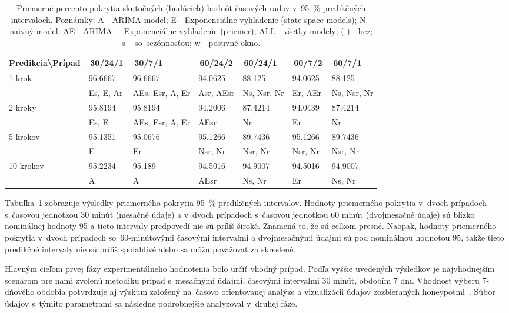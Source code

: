 \documentclass[thesismargins, thesislinespacing, openright, upjsfrontpage]{rnthesis}
\begin{document}
\begin{table}[h]
    \centering
    \footnotesize 
    \begin{tabular}{|p{3cm}|p{1.5cm}|p{1.5cm}|p{1.5cm}|p{1.5cm}|p{1.5cm}|p{1.5cm}|} \hline
        Predikcia\textbackslash Prípad & \,30/24/1\, & \,30/7/1\, & \,60/24/2\, & \,60/24/1\, & \,60/7/2\, & \,60/7/1\, \\
     \hline\hline
        \multirow{2}{*}{1 krok} & 96.6667 & 96.6667 & 94.0625 & 88.125 & 94.0625 & 88.125 \\
        & Es, E, Ar & AEs, Esr, A, Er & Asr, AEsr & Ns, Nsr, Nr & Er, AEr & Ns, Nsr, Nr  \\
        \hline
        \multirow{2}{*}{2 kroky} & 95.8194 & 95.8194 & 94.2006 & 87.4214 & 94.0439 & 87.4214 \\
        & Es, E & AEs, Esr, A, Er & AEsr & Nr & Er & Nr \\
        \hline
        \multirow{2}{*}{5 krokov} & 95.1351 & 95.0676 & 95.1266 & 89.7436 & 95.1266 & 89.7436 \\
        & E & Er & Nsr, Nr & Nsr, Nr & Nsr, Nr & Nsr, Nr  \\
        \hline
        \multirow{2}{*}{10 krokov} & 95.2234 & 95.189 & 94.5016 & 94.9007 & 94.5016 & 94.9007 \\
        & A & A & AEsr & Ns, Nr & Er & Ns, Nr \\
        \hline
    \end{tabular}
    \caption{Priemerné percento pokrytia skutočných (budúcich) hodnôt časových radov v~95~\% predikčných intervaloch. Poznámky: A - ARIMA model; E - Exponenciálne vyhladenie (state space models); N - naivný model; AE - ARIMA + Exponenciálne vyhladenie (priemer); ALL - všetky modely; (-) - bez; s~- so~sezónnosťou; w - posuvné okno.}
    \label{tab:avg_95}
\end{table}

Tabuľka~\ref{tab:avg_95} zobrazuje výsledky priemerného pokrytia 95~\% predikčných intervalov. Hodnoty priemerného pokrytia v~dvoch prípadoch s~časovou jednotkou 30 minút (mesačné údaje) a v~dvoch prípadoch s~časovou jednotkou 60 minút (dvojmesačné údaje) sú blízko nominálnej hodnoty 95 a tieto intervaly predpovedí nie sú príliš široké. Znamená to, že sú celkom presné. Naopak, hodnoty priemerného pokrytia v~dvoch prípadoch so~60-minútovými časovými intervalmi a dvojmesačnými údajmi sú pod nominálnou hodnotou 95, takže tieto predikčné intervaly nie sú príliš spoľahlivé alebo sa môžu považovať za skreslené.

Hlavným cieľom prvej fázy experimentálneho hodnotenia bolo určiť vhodný prípad. Podľa vyššie uvedených výsledkov je najvhodnejším scenárom pre nami zvolenú metodiku prípad s~mesačnými údajmi, časovými intervalmi 30 minút, obdobím 7 dní. Vhodnosť výberu 7-dňového obdobia potvrdzuje aj výskum založený na~časovo orientovanej analýze a vizualizácii údajov zozbieraných honeypotmi~\cite{sokol2015study}. Súbor údajov s~týmito parametrami sa následne podrobnejšie analyzoval v~druhej fáze.
\end{document}
